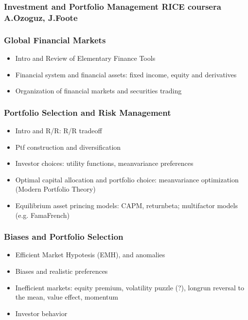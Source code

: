 \documentclass[letterpaper,10pt,italian]{jupyterBook}
\begin{document}
\subsubsection*{Investment and Portfolio Management \sphinxhyphen{} RICE \sphinxhyphen{} coursera \sphinxhyphen{} A.Ozoguz, J.Foote}
\subsubsection*{Global Financial Markets}
\begin{itemize}
\item {} 
\sphinxAtStartPar
Intro and Review of Elementary Finance Tools

\item {} 
\sphinxAtStartPar
Financial system and financial assets: fixed income, equity and derivatives

\item {} 
\sphinxAtStartPar
Organization of financial markets and securities trading

\end{itemize}
\subsubsection*{Portfolio Selection and Risk Management}
\begin{itemize}
\item {} 
\sphinxAtStartPar
Intro and R/R: R/R trade\sphinxhyphen{}off

\item {} 
\sphinxAtStartPar
Ptf construction and diversification

\item {} 
\sphinxAtStartPar
Investor choices: utility functions, mean\sphinxhyphen{}variance preferences

\item {} 
\sphinxAtStartPar
Optimal capital allocation and portfolio choice: mean\sphinxhyphen{}variance optimization (Modern Portfolio Theory)

\item {} 
\sphinxAtStartPar
Equilibrium asset princing models: CAPM, return\sphinxhyphen{}beta; multi\sphinxhyphen{}factor models (e.g. Fama\sphinxhyphen{}French)

\end{itemize}
\subsubsection*{Biases and Portfolio Selection}
\begin{itemize}
\item {} 
\sphinxAtStartPar
Efficient Market Hypotesis (EMH), and anomalies

\item {} 
\sphinxAtStartPar
Biases and realistic preferences

\item {} 
\sphinxAtStartPar
Inefficient markets: equity premium, volatility puzzle (?), long\sphinxhyphen{}run reversal to the mean, value effect, momentum

\item {} 
\sphinxAtStartPar
Investor behavior

\end{itemize}
\end{document}
